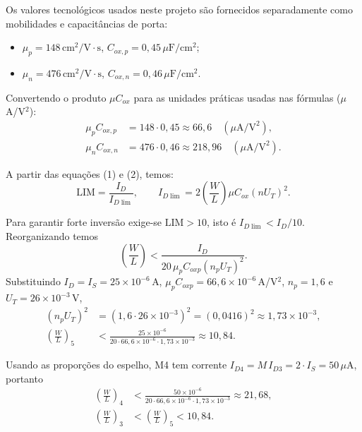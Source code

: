 ﻿\documentclass[12pt,a4paper]{article}
\begin{document}
Os valores tecnológicos usados neste projeto são fornecidos separadamente como mobilidades e capacitâncias de porta:
\begin{center}
\begin{minipage}{0.55\textwidth}
\begin{itemize}
    \item $\mu_p = 148\,\text{cm}^2/\text{V}\cdot\text{s}$, \quad $C_{ox,p}=0{,}45\,\mu\text{F}/\text{cm}^2$;
    \item $\mu_n = 476\,\text{cm}^2/\text{V}\cdot\text{s}$, \quad $C_{ox,n}=0{,}46\,\mu\text{F}/\text{cm}^2$.
\end{itemize}
\end{minipage}
\end{center}
Convertendo o produto $\mu C_{ox}$ para as unidades práticas usadas nas fórmulas ($\mu$A/V$^2$):
\begin{align*}
\mu_p C_{ox,p} &= 148\cdot 0{,}45 \approx 66{,}6\quad (\mu\text{A}/\text{V}^2),\\
\mu_n C_{ox,n} &= 476\cdot 0{,}46 \approx 218{,}96\quad (\mu\text{A}/\text{V}^2).
\end{align*}


A partir das equações (1) e (2), temos:
\begin{equation}
\mathrm{LIM} = \frac{I_D}{I_{D\lim}},\qquad I_{D\lim} = 2\left(\frac{W}{L}\right)\mu C_{ox}(nU_T)^2.
\end{equation}

Para garantir forte inversão exige-se $\mathrm{LIM}>10$, isto é $I_{D\lim}<I_D/10$. Reorganizando temos
\begin{equation}\label{eq:pmos-lim2}
\left(\frac{W}{L}\right) < \frac{I_D}{20\,\mu_p C_{ox p}(n_p U_T)^2}.
\end{equation}
Substituindo $I_D=I_S=25\times10^{-6}\,$A, $\mu_p C_{ox p}=66{,}6\times10^{-6}\,$A/V$^2$, $n_p=1{,}6$ e $U_T=26\times10^{-3}\,$V,
\begin{align*}
(n_p U_T)^2 &= (1{,}6\cdot 26\times10^{-3})^2 = (0{,}0416)^2\approx 1{,}73\times10^{-3},\\
\left(\frac{W}{L}\right)_5 &< \frac{25\times10^{-6}}{20\cdot 66{,}6\times10^{-6}\cdot 1{,}73\times10^{-3}} \approx \boxed{10{,}84}.
\end{align*}

Usando as proporções do espelho, M4 tem corrente $I_{D4}=M\,I_{D3}=2\cdot I_S = 50\,\mu$A, portanto
\begin{align*}
\left(\frac{W}{L}\right)_4 &< \frac{50\times10^{-6}}{20\cdot 66{,}6\times10^{-6}\cdot 1{,}73\times10^{-3}} \approx \boxed{21{,}68},\\
\left(\frac{W}{L}\right)_3 &< \left(\frac{W}{L}\right)_5 < 10{,}84.
\end{align*}
\end{document}
